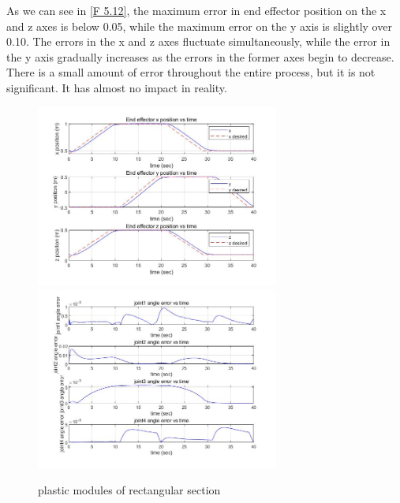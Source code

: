 As we can see in \autoref{F 5.12}, the maximum error in end effector position on the x and z axes is below 0.05, while the maximum error on the y axis is slightly over 0.10. The errors in the x and z axes fluctuate simultaneously, while the error in the y axis gradually increases as the errors in the former axes begin to decrease. There is a small amount of error throughout the entire process, but it is not significant. It has almost no impact in reality.

\begin{figure}[htbp]
	\centering
	\includegraphics[width=8cm]{./fig/5.jpg}
	\includegraphics[width=8cm]{./fig/7.jpg}
	\caption{plastic modules of rectangular section}
	\label{F 5.12}
\end{figure}